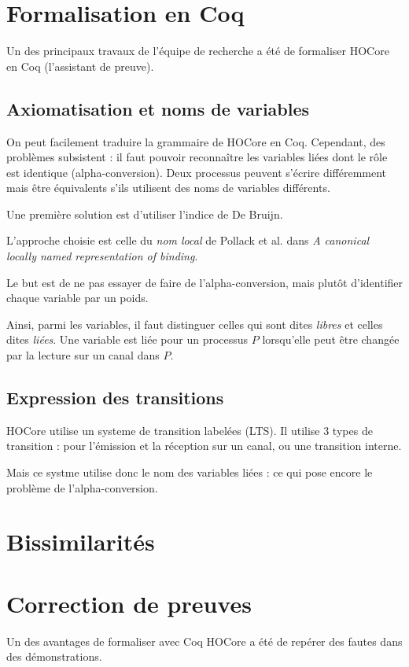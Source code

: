 \documentclass{article}
\begin{document}
\section{Formalisation en Coq}
Un des principaux travaux de l'équipe de recherche a été de formaliser HOCore en Coq (l'assistant de preuve).

\subsection{Axiomatisation et noms de variables}
On peut facilement traduire la grammaire de HOCore en Coq. Cependant, des problèmes subsistent : il faut pouvoir reconnaître les variables liées dont le rôle est identique (alpha-conversion). Deux processus peuvent s'écrire différemment mais être équivalents s'ils utilisent des noms de variables différents. %

Une première solution est d'utiliser l'indice de De Bruijn. %

L'approche choisie est celle du \textit{nom local} %
de Pollack et al. dans \textit{A canonical locally named representation of binding}.

Le but est de ne pas essayer de faire de l'alpha-conversion, mais plutôt d'identifier chaque variable par un poids.


Ainsi, parmi les variables, il faut distinguer celles qui sont dites \textit{libres} et celles dites \textit{liées}.
Une variable est liée pour un processus $P$ lorsqu'elle peut être changée par la lecture sur un canal dans $P$.



\subsection{Expression des transitions}
HOCore utilise un systeme de transition labelées (LTS). Il utilise 3 types de transition : pour l'émission et la réception sur un canal, ou une transition interne.

Mais ce systme utilise donc le nom des variables liées : ce qui pose encore le problème de l'alpha-conversion.


\section{Bissimilarités}


\section{Correction de preuves}
Un des avantages de formaliser avec Coq HOCore a été de repérer des fautes dans des démonstrations.
\end{document}
